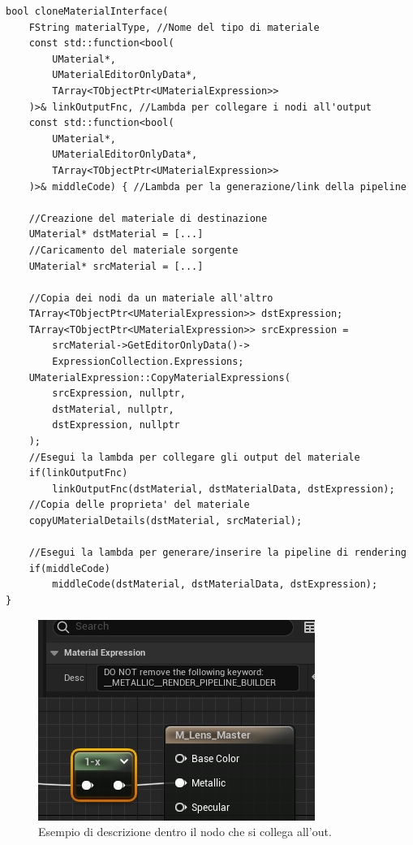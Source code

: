 \documentclass[main.tex]{subfiles}
\begin{document}
\begin{lstlisting}
bool cloneMaterialInterface(
    FString materialType, //Nome del tipo di materiale
    const std::function<bool(
        UMaterial*,
        UMaterialEditorOnlyData*,
        TArray<TObjectPtr<UMaterialExpression>>
    )>& linkOutputFnc, //Lambda per collegare i nodi all'output
    const std::function<bool(
        UMaterial*,
        UMaterialEditorOnlyData*,
        TArray<TObjectPtr<UMaterialExpression>>
    )>& middleCode) { //Lambda per la generazione/link della pipeline

    //Creazione del materiale di destinazione
    UMaterial* dstMaterial = [...]
    //Caricamento del materiale sorgente
    UMaterial* srcMaterial = [...]

    //Copia dei nodi da un materiale all'altro
	TArray<TObjectPtr<UMaterialExpression>> dstExpression;
	TArray<TObjectPtr<UMaterialExpression>> srcExpression =
        srcMaterial->GetEditorOnlyData()->
        ExpressionCollection.Expressions;
	UMaterialExpression::CopyMaterialExpressions(
        srcExpression, nullptr,
        dstMaterial, nullptr,
        dstExpression, nullptr
    );
	//Esegui la lambda per collegare gli output del materiale
	if(linkOutputFnc)
        linkOutputFnc(dstMaterial, dstMaterialData, dstExpression);
	//Copia delle proprieta' del materiale
	copyUMaterialDetails(dstMaterial, srcMaterial);

	//Esegui la lambda per generare/inserire la pipeline di rendering
	if(middleCode)
        middleCode(dstMaterial, dstMaterialData, dstExpression);
}
\end{lstlisting}
\clearpage %
\begin{figure}
    \centering
    \captionsetup{justification=centering}
    \includegraphics[scale=0.65]{img/renderingPipeline/descLink.jpg}
    \caption{Esempio di descrizione dentro il nodo che si collega all'out.}
    \label{fig:2_searchDesc}
\end{figure}
\end{document}
